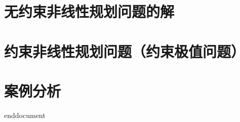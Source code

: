     \section{无约束非线性规划问题的解}
    \section{约束非线性规划问题（约束极值问题）}
    \section{案例分析}
    

\ifx\allfiles\undefined
	
	
	
	end{document}
	\else
	\fi